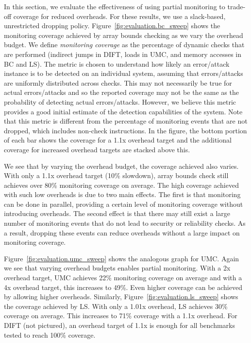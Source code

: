 In this section, we evaluate the effectiveness of
using partial monitoring to trade-off coverage for reduced overheads.
For these results, we use a slack-based, unrestricted dropping policy.
Figure~\ref{fig:evaluation.bc_sweep} shows the monitoring coverage achieved by
array bounds checking as we vary the overhead budget. 
We define \emph{monitoring coverage} as the 
percentage of dynamic checks that are performed 
(indirect jumps in DIFT, loads in UMC, and memory accesses in BC and LS). 
The metric is chosen to understand
how likely an error/attack instance is to be detected on an individual system, 
assuming that errors/attacks are uniformly distributed across checks. This may
not necessarily be true for actual errors/attacks and so the reported coverage
may not be the same as the probability of detecting actual errors/attacks.
However, we believe this metric
provides a good initial estimate of the detection capabilities of the system.
Note that this metric is different from the
percentage of monitoring events that are not dropped, which includes
non-check instructions.
In the figure, the bottom portion of each
bar shows the coverage for a 1.1x overhead target and the additional
coverage for increased overhead targets are stacked above this.

We see that by varying the overhead budget, the coverage achieved also varies.
With only a 1.1x overhead target (10\% slowdown), array bounds check still
achieves over 80\% monitoring coverage on average. The high coverage
achieved with such low overheads is due to two main effects.  The first is that
monitoring can be done in parallel, providing a certain level of monitoring coverage without
introducing overheads. The second effect is that there may still exist a large number of
monitoring events that do not lead to security or reliability checks. As a
result, dropping these events can reduce overheads without a large impact on
monitoring coverage.

Figure~\ref{fig:evaluation.umc_sweep} shows the analogous graph for UMC. Again
we see that varying overhead budgets enables partial monitoring.
With a 2x overhead target, UMC achieves 22\% monitoring coverage on average and with a 4x overhead target, this increases to 49\%.
Even higher coverage can be achieved by allowing higher overheads.
Similarly, Figure~\ref{fig:evaluation.ls_sweep} shows the coverage achieved by LS.
With only a 1.01x overhead, LS achieves 30\% coverage on average. This increases to
71\% coverage with a 1.1x overhead. 
For DIFT (not pictured), an overhead target of 1.1x is enough for
all benchmarks tested to reach 100\% coverage.

